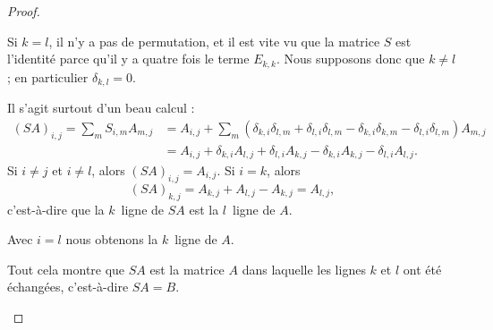 \begin{proof}
\begin{subproof}
		\spitem[\ref{ITEMooDNHWooOMgmxa}]
		Si \( k=l\), il n'y a pas de permutation, et il est vite vu que la matrice \( S\) est l'identité parce qu'il y a quatre fois le terme \( E_{k,k}\). Nous supposons donc que \( k\neq l\); en particulier \( \delta_{k,l}=0\).

		Il s'agit surtout d'un beau calcul :
		\begin{subequations}
			\begin{align}
				(SA)_{i,j}=\sum_{m}S_{i,m}A_{m,j} & =A_{i,j}+\sum_m(\delta_{k,i}\delta_{l,m}+\delta_{l,i}\delta_{l,m}-\delta_{k,i}\delta_{k,m}-\delta_{l,i}\delta_{l,m})A_{m,j} \\
				                                  & =A_{i,j}+\delta_{k,i}A_{l,j}+\delta_{l,i}A_{k,j}-\delta_{k,i}A_{k,j}-\delta_{l,i}A_{l,j}.
			\end{align}
		\end{subequations}
		Si \( i\neq j\) et \( i\neq l\), alors \( (SA)_{i,j}=A_{i,j}\). Si \( i=k\), alors
		\begin{equation}
			(SA)_{k,j}=A_{k,j}+A_{l,j}-A_{k,j}=A_{l,j},
		\end{equation}
		c'est-à-dire que la \( k\)\ieme\ ligne de \( SA\) est la \( l\)\ieme\ ligne de \( A\).

		Avec \( i=l\) nous obtenons la \( k\)\ieme\ ligne de \( A\).

		Tout cela montre que \( SA\) est la matrice \( A\) dans laquelle les lignes \( k\) et \( l\) ont été échangées, c'est-à-dire \( SA=B\).


\end{subproof}
\end{proof}
